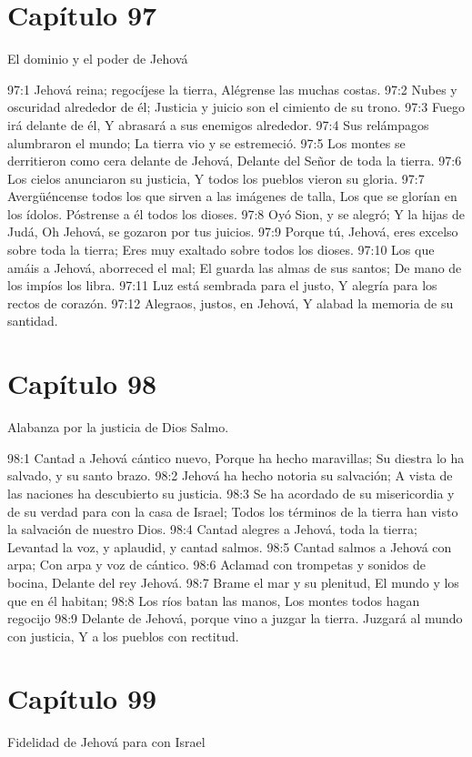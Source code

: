 \section*{Capítulo 97}
El dominio y el poder de Jehová 
 
97:1 Jehová reina; regocíjese la tierra, 
Alégrense las muchas costas. 
97:2 Nubes y oscuridad alrededor de él; 
Justicia y juicio son el cimiento de su trono. 
97:3 Fuego irá delante de él, 
Y abrasará a sus enemigos alrededor. 
97:4 Sus relámpagos alumbraron el mundo; 
La tierra vio y se estremeció. 
97:5 Los montes se derritieron como cera delante de Jehová, 
Delante del Señor de toda la tierra. 
97:6 Los cielos anunciaron su justicia, 
Y todos los pueblos vieron su gloria. 
97:7 Avergüéncense todos los que sirven a las imágenes de talla, 
Los que se glorían en los ídolos. 
Póstrense a él todos los dioses. 
97:8 Oyó Sion, y se alegró; 
Y la hijas de Judá, 
Oh Jehová, se gozaron por tus juicios. 
97:9 Porque tú, Jehová, eres excelso sobre toda la tierra; 
Eres muy exaltado sobre todos los dioses. 
97:10 Los que amáis a Jehová, aborreced el mal; 
El guarda las almas de sus santos; 
De mano de los impíos los libra. 
97:11 Luz está sembrada para el justo, 
Y alegría para los rectos de corazón. 
97:12 Alegraos, justos, en Jehová, 
Y alabad la memoria de su santidad. 
\section*{Capítulo 98}
Alabanza por la justicia de Dios 
Salmo. 
 
98:1 Cantad a Jehová cántico nuevo, 
Porque ha hecho maravillas; 
Su diestra lo ha salvado, y su santo brazo. 
98:2 Jehová ha hecho notoria su salvación; 
A vista de las naciones ha descubierto su justicia. 
98:3 Se ha acordado de su misericordia y de su verdad para con la casa de Israel; 
Todos los términos de la tierra han visto la salvación de nuestro Dios. 
98:4 Cantad alegres a Jehová, toda la tierra; 
Levantad la voz, y aplaudid, y cantad salmos. 
98:5 Cantad salmos a Jehová con arpa; 
Con arpa y voz de cántico. 
98:6 Aclamad con trompetas y sonidos de bocina, 
Delante del rey Jehová. 
98:7 Brame el mar y su plenitud, 
El mundo y los que en él habitan; 
98:8 Los ríos batan las manos, 
Los montes todos hagan regocijo 
98:9 Delante de Jehová, porque vino a juzgar la tierra. 
Juzgará al mundo con justicia, 
Y a los pueblos con rectitud. 
\section*{Capítulo 99}
Fidelidad de Jehová para con Israel 
 
